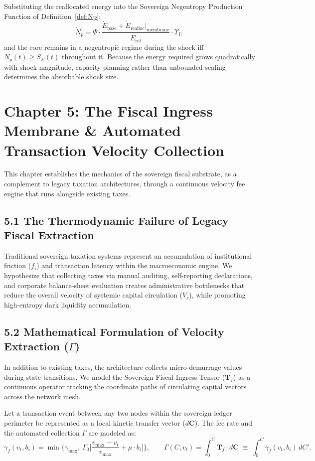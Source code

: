 \documentclass[11pt,a4paper]{article}
\theoremstyle{definition}
\theoremstyle{plain}
\theoremstyle{remark}
\newcommand{\Eref}{\dot E_{\mathrm{ref}}}
\begin{document}
Substituting the reallocated energy into the Sovereign Negentropy Production Function of Definition~\ref{def:Np}:
\begin{equation}
\dot N_p = \Psi \cdot \frac{\dot E_{\mathrm{base}} + \dot E_{\mathrm{realloc}}\big|_{\mathrm{membrane}}}{\Eref} \cdot \Upsilon_I ,
\end{equation}
and the core remains in a negentropic regime during the shock iff $\dot N_p(t) \ge \dot S_E(t)$ throughout it. Because the energy required grows quadratically with shock magnitude, capacity planning rather than unbounded scaling determines the absorbable shock size.

\clearpage
\clearpage
\section*{Chapter 5: The Fiscal Ingress Membrane \& Automated Transaction Velocity Collection}
This chapter establishes the mechanics of the sovereign fiscal substrate, as a complement to legacy taxation architectures, through a continuous velocity fee engine that runs alongside existing taxes.

\subsection*{5.1 The Thermodynamic Failure of Legacy Fiscal Extraction}
Traditional sovereign taxation systems represent an accumulation of institutional friction ($f_i$) and transaction latency within the macroeconomic engine. We hypothesize that collecting taxes via manual auditing, self-reporting declarations, and corporate balance-sheet evaluation creates administrative bottlenecks that reduce the overall velocity of systemic capital circulation ($V_c$), while promoting high-entropy dark liquidity accumulation.

\subsection*{5.2 Mathematical Formulation of Velocity Extraction ($\Gamma$)}
In addition to existing taxes, the architecture collects micro-demurrage values during state transitions. We model the Sovereign Fiscal Ingress Tensor ($\mathbf T_f$) as a continuous operator tracking the coordinate paths of circulating capital vectors across the network mesh.

Let a transaction event between any two nodes within the sovereign ledger perimeter be represented as a local kinetic transfer vector ($d\mathbf C$). The fee rate and the automated collection $\Gamma$ are modeled as:
\begin{equation}
\gamma_f(v_t, b_i) = \min\Big\{\gamma_{\max},\ \Gamma_0 \Big[ \frac{v_{\max} - v_t}{v_{\max}} + \mu \cdot b_i \Big] \Big\},
\qquad
\Gamma(C, v_t) = \int_0^C \mathbf T_f \cdot d\mathbf C \;\equiv\; \int_0^C \gamma_f(v_t, b_i)\, dC' .
\end{equation}
\end{document}
